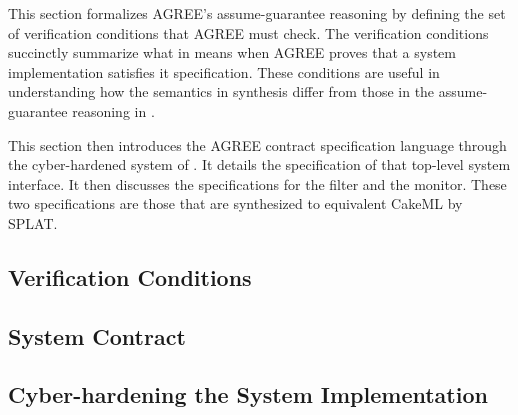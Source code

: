 This section formalizes AGREE's assume-guarantee reasoning by defining the set of verification conditions that AGREE must check.
The verification conditions succinctly summarize what in means when AGREE proves that a system implementation satisfies it specification.
These conditions are useful in understanding how the semantics in synthesis differ from those in the assume-guarantee reasoning in .

This section then introduces the AGREE contract specification language through the cyber-hardened system of .
It details the specification of that top-level system interface.
It then discusses the specifications for the filter and the monitor.
These two specifications are those that are synthesized to equivalent CakeML by SPLAT.

\subsection{Verification Conditions}


\subsection{System Contract}


\subsection{Cyber-hardening the System Implementation}


